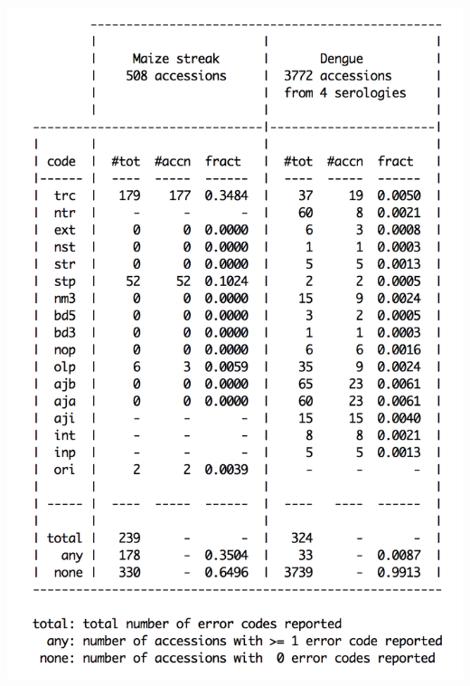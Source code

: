 \documentclass[landscape]{slides}
\begin{document}
\begin{slide}
\begin{center}
\includegraphics[height=8in]{figs/pilot-errcode-table-2}
\vfill
\end{center}
\end{slide}
\end{document}

